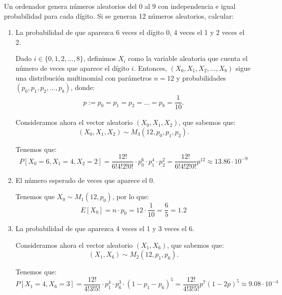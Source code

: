 \begin{ejercicio}
    Un ordenador genera números aleatorios del 0 al 9 con independencia e igual probabilidad para cada dígito. Si se generan 12 números aleatorios, calcular:
    \begin{enumerate}
        \item La probabilidad de que aparezca 6 veces el dígito 0, 4 veces el 1 y 2 veces el 2.
        
        Dado $i\in \{0,1,2,\ldots,8\}$, definimos $X_i$ como la variable aleatoria que cuenta el número de veces que aparece el dígito $i$. Entonces, $(X_0,X_1,X_2,\ldots,X_8)$ sigue una distribución multinomial con parámetros $n = 12$ y probabilidades $(p_0,p_1,p_2,\ldots,p_8)$, donde:
        \begin{gather*}
            p := p_0 = p_1 = p_2 = \ldots = p_8 = \dfrac{1}{10}.
        \end{gather*}

        Consideramos ahora el vector aleatorio $(X_0,X_1,X_2)$, que sabemos que:
        \begin{equation*}
            (X_0,X_1,X_2) \sim M_3\left(12,p_0,p_1,p_2\right).
        \end{equation*}

        Tenemos que:
        \begin{equation*}
            P[X_0 = 6,X_1 = 4,X_2 = 2] = \dfrac{12!}{6!4!2!0!}\cdot p_0^6 \cdot p_1^4 \cdot p_2^2
            = \dfrac{12!}{6!4!2!0!} p^{12}
            \approx 13.86\cdot 10^{-9}
        \end{equation*}
        \item El número esperado de veces que aparece el 0.
        
        Tenemos que $X_0 \sim M_1\left(12,p_0\right)$, por lo que:
        \begin{equation*}
            E[X_0] = n\cdot p_0 = 12\cdot \dfrac{1}{10} = \frac{6}{5} = 1.2
        \end{equation*}
        \item La probabilidad de que aparezca 4 veces el 1 y 3 veces el 6.
        
        Consideramos ahora el vector aleatorio $(X_1,X_6)$, que sabemos que:
        \begin{equation*}
            (X_1,X_6) \sim M_2\left(12,p_1,p_6\right).
        \end{equation*}

        Tenemos que:
        \begin{equation*}
            P[X_1 = 4,X_6 = 3] = \dfrac{12!}{4!3!5!}\cdot p_1^4 \cdot p_6^3 \cdot (1-p_1-p_6)^5
            = \dfrac{12!}{4!3!5!} p^7 (1-2p)^5
            \approx 9.08\cdot 10^{-4}
        \end{equation*}
    \end{enumerate}
\end{ejercicio}

